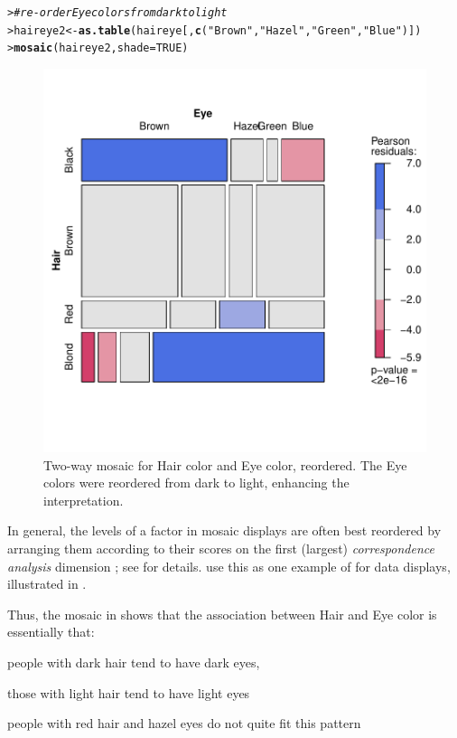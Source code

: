 \documentclass[10pt,krantz2]{krantz}\usepackage[]{graphicx}\usepackage[]{color}
\makeatletter
\newcommand{\hlnum}[1]{\textcolor[rgb]{0.686,0.059,0.569}{#1}}%
\newcommand{\hlstr}[1]{\textcolor[rgb]{0.192,0.494,0.8}{#1}}%
\newcommand{\hlcom}[1]{\textcolor[rgb]{0.678,0.584,0.686}{\textit{#1}}}%
\newcommand{\hlstd}[1]{\textcolor[rgb]{0.345,0.345,0.345}{#1}}%
\newcommand{\hlkwb}[1]{\textcolor[rgb]{0.69,0.353,0.396}{#1}}%
\newcommand{\hlkwc}[1]{\textcolor[rgb]{0.333,0.667,0.333}{#1}}%
\newcommand{\hlkwd}[1]{\textcolor[rgb]{0.737,0.353,0.396}{\textbf{#1}}}%
\newenvironment{kframe}{%
 \def\at@end@of@kframe{}%
 \ifinner\ifhmode%
  \def\at@end@of@kframe{\end{minipage}}%
  \begin{minipage}{\columnwidth}%
 \fi\fi%
 \def\FrameCommand##1{\hskip\@totalleftmargin \hskip-\fboxsep
 \colorbox{shadecolor}{##1}\hskip-\fboxsep
     \hskip-\linewidth \hskip-\@totalleftmargin \hskip\columnwidth}%
 \MakeFramed {\advance\hsize-\width
   \@totalleftmargin\z@ \linewidth\hsize
   \@setminipage}}%
 {\par\unskip\endMakeFramed%
 \at@end@of@kframe}
\newenvironment{knitrout}{}{} %
\renewenvironment{knitrout}{\small\renewcommand{\baselinestretch}{.85}}{} %
\makeatother
\begin{document}
\begin{knitrout}
\color{fgcolor}\begin{kframe}
\begin{alltt}
\hlstd{> }\hlcom{# re-order Eye colors from dark to light}
\hlstd{> }\hlstd{haireye2} \hlkwb{<-} \hlkwd{as.table}\hlstd{(haireye[,} \hlkwd{c}\hlstd{(}\hlstr{"Brown"}\hlstd{,} \hlstr{"Hazel"}\hlstd{,} \hlstr{"Green"}\hlstd{,} \hlstr{"Blue"}\hlstd{)])}
\hlstd{> }\hlkwd{mosaic}\hlstd{(haireye2,} \hlkwc{shade} \hlstd{=} \hlnum{TRUE}\hlstd{)}
\end{alltt}
\end{kframe}\begin{figure}[!htbp]

\centerline{\includegraphics[width=.6\textwidth]{ch05/fig/haireye-mos9-1} }

\caption[Two-way mosaic for Hair color and Eye color, reordered]{Two-way mosaic for Hair color and Eye color, reordered. The Eye colors were reordered from dark to light, enhancing the interpretation.\label{fig:haireye-mos9}}
\end{figure}


\end{knitrout}

In general, the levels of a factor in mosaic displays
are often best reordered by
arranging them according to their scores on the first (largest)
\emph{correspondence analysis} dimension \citep{Friendly:94a};
see  for details.
\citet{FriendlyKwan:02:effect} use this as one example of
 for data displays, illustrated in .

Thus, the mosaic in  shows that the association between Hair and Eye color
is essentially that:
\begin{itemize*}
\item people with dark hair tend to have dark eyes,
\item those with light hair tend to have light eyes
\item people with red hair and hazel eyes do not quite fit this pattern
\end{itemize*}
\end{document}

